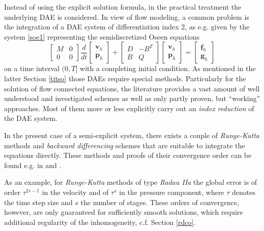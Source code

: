 \documentclass[a4paper,10pt,BCOR=15mm]{scrbook}
\begin{document}
Instead of using the explicit solution formula, in the practical treatment the underlying DAE is considered. In view of flow modeling, a common problem is the integration of a DAE system of differentiation index 2, as e.g. given by the system \eqref{soe1} representing the semidiscretized Oseen equations
\begin{equation}\label{soe2}
	\begin{bmatrix} M& 0 \\ 0& 0 \end{bmatrix} \frac{d}{dt}{\begin{bmatrix} \mathbf v_h \\ \mathbf p_h  \end{bmatrix}} + \begin{bmatrix} D& -B^T \\ B& Q \end{bmatrix} \begin{bmatrix} \mathbf v_h \\ \mathbf p_h  \end{bmatrix} = \begin{bmatrix} \mathbf f_h \\ \mathbf g_h \end{bmatrix} 
\end{equation}
on a time interval $(0,T]$ with a completing initial condition. As mentioned in the latter Section \ref{titso} those DAEs require special methods. Particularly for the solution of flow connected equations, the literature provides a vast amount of well understood and investigated schemes as well as only partly proven, but ``working'' approaches. Most of them more or less explicitly carry out an \textit{index reduction} of the DAE system.
 
In the present case of a semi-explicit system, there exists a couple of \textit{Runge-Kutta} methods and \textit{backward differencing} schemes that are suitable to integrate the equations directly. These methods and proofs of their convergence order can be found e.g. in \cite[Chapters VII.3/VII.4]{hawa} and \cite{haluro}.

As an example, for \textit{Runge-Kutta} methods of type \textit{Radau IIa} the global error is of order $\tau^{2s-1}$ in the velocity and of $\tau^{s}$ in the pressure component, where $\tau$ denotes the time step size and $s$ the number of stages. These orders of convergence, however, are only guaranteed for sufficiently smooth solutions, which require additional regularity of the inhomogeneity, c.f. Section \ref{rdco}.
\end{document}
